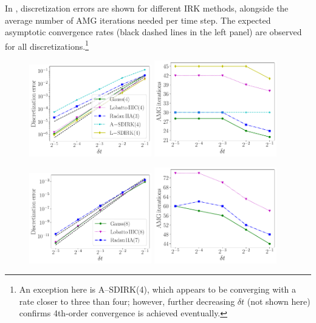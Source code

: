 \documentclass[review]{siamart}
\begin{document}
In , discretization errors are shown for different IRK
methods, alongside the average number of AMG iterations needed per time step.
The expected asymptotic convergence rates (black dashed lines in the left panel)
are observed for all discretizations.\footnote{An exception here is A--SDIRK(4),
which appears to be converging with a rate closer to three than four; however,
further decreasing $\delta t$ (not shown here) confirms 4th-order convergence
is achieved eventually.}

\begin{figure}[!htb]
\centerline{
\includegraphics[width = 0.475\textwidth]{figures/FD_ex/errors_iters_14_34_23_-14_4_d2_ex1.pdf}
\quad
\includegraphics[width = 0.475\textwidth]{figures/FD_ex/amg_iters_14_34_23_-14_4_d2_ex1.pdf}
}
\centerline{
\includegraphics[width = 0.475\textwidth]{figures/FD_ex/errors_iters_18_38_27_d2_ex1.pdf}
\quad
\includegraphics[width = 0.475\textwidth]{figures/FD_ex/amg_iters_18_38_27_d2_ex1.pdf}
}
\end{figure}
\end{document}
